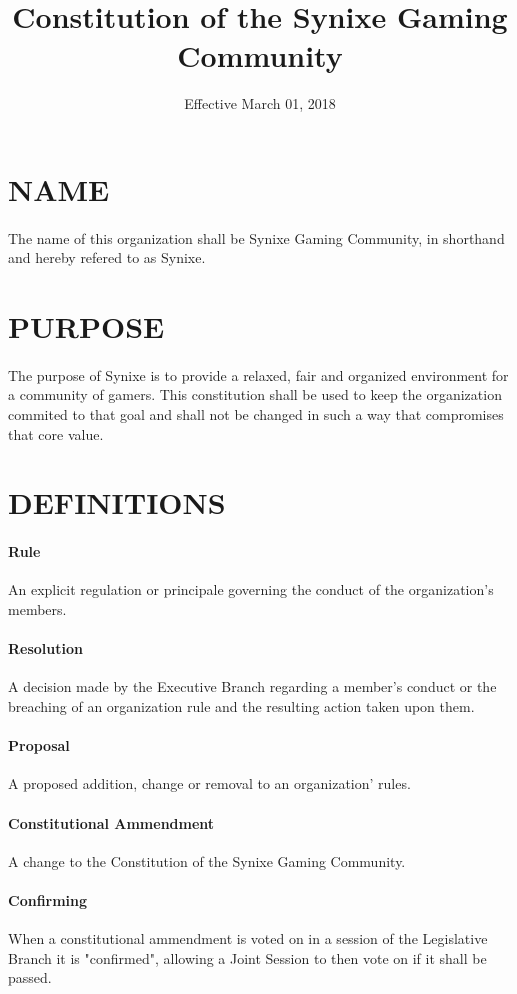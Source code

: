 \documentclass[10pt,a4paper]{article}
\title{Constitution of the Synixe Gaming Community}
\date{Effective March 01, 2018}
\begin{document}
\maketitle
\newpage
\section{NAME}
\paragraph{}
The name of this organization shall be Synixe Gaming Community, in shorthand and hereby refered to as Synixe.
\section{PURPOSE}
\paragraph{}
The purpose of Synixe is to provide a relaxed, fair and organized environment for a community of gamers. This constitution shall be used to keep the organization commited to that goal and shall not be changed in such a way that compromises that core value.
\section{DEFINITIONS}
\paragraph{Rule} An explicit regulation or principale governing the conduct of the organization's members.
\paragraph{Resolution} A decision made by the Executive Branch regarding a member's conduct or the breaching of an organization rule and the resulting action taken upon them.
\paragraph{Proposal} A proposed addition, change or removal to an organization' rules.
\paragraph{Constitutional Ammendment} A change to the Constitution of the Synixe Gaming Community.
\paragraph{Confirming} When a constitutional ammendment is voted on in a session of the Legislative Branch it is "confirmed", allowing a Joint Session to then vote on if it shall be passed.
\end{document}
